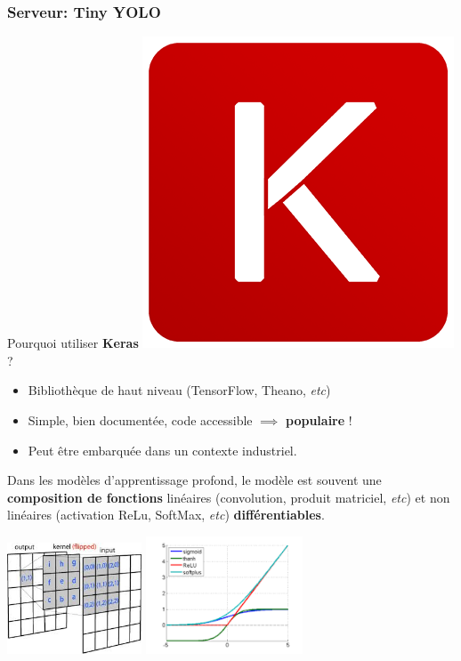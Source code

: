 \documentclass[11pt]{beamer}
\begin{document}
\begin{frame}
\frametitle{Serveur: Tiny YOLO}
\vspace{-2mm}
Pourquoi utiliser \textbf{Keras} \includegraphics[keepaspectratio=true,height=0.9\baselineskip]{images/keras.png} ?
\begin{itemize}
\item Bibliothèque de haut niveau (TensorFlow, Theano, \emph{etc})
\item Simple, bien documentée, code accessible $\implies$ \textbf{populaire} !
\item Peut être embarquée dans un contexte industriel.
\end{itemize}
\vspace{3mm}
Dans les modèles d'apprentissage profond, le modèle est souvent une \textbf{composition de fonctions} linéaires (convolution, produit matriciel, \emph{etc}) et non linéaires (activation ReLu, SoftMax, \emph{etc}) \textbf{différentiables}.

\begin{center}
\includegraphics[keepaspectratio=true, width=0.3\textwidth]{images/convolution.jpeg}
\hspace{1cm}
\includegraphics[keepaspectratio=true,width=0.35\textwidth]{images/Relu.png}
\end{center}
\end{frame}
\end{document}
